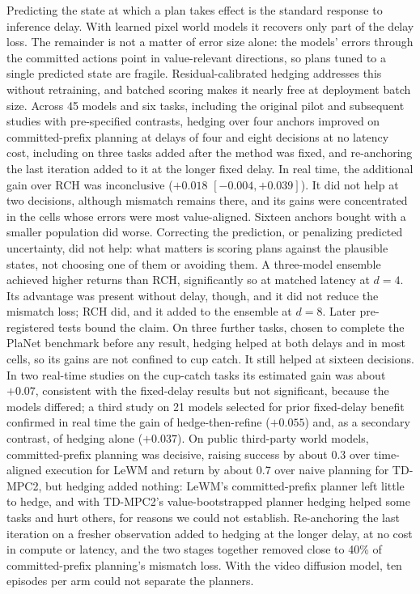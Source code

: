 \documentclass[aps,physrev,\manuscriptlayout,superscriptaddress,
  longbibliography,amsmath,amssymb]{revtex4-2}
\begin{document}
Predicting the state at which a plan takes effect is the standard response to inference delay\cite{findeisen2004computational,elasri2025rthcp,muppidi2026time}. With learned pixel world models it recovers only part of the delay loss. The remainder is not a matter of error size alone: the models' errors through the committed actions point in value-relevant directions, so plans tuned to a single predicted state are fragile. Residual-calibrated hedging addresses this without retraining, and batched scoring makes it nearly free at deployment batch size. Across 45 models and six tasks, including the original pilot and subsequent studies with pre-specified contrasts, hedging over four anchors improved on committed-prefix planning at delays of four and eight decisions at no latency cost, including on three tasks added after the method was fixed, and re-anchoring the last iteration added to it at the longer fixed delay. In real time, the additional gain over RCH was inconclusive ($+0.018$ $[-0.004, +0.039]$). It did not help at two decisions, although mismatch remains there, and its gains were concentrated in the cells whose errors were most value-aligned. Sixteen anchors bought with a smaller population did worse. Correcting the prediction, or penalizing predicted uncertainty, did not help: what matters is scoring plans against the plausible states, not choosing one of them or avoiding them. A three-model ensemble achieved higher returns than RCH, significantly so at matched latency at $d=4$. Its advantage was present without delay, though, and it did not reduce the mismatch loss; RCH did, and it added to the ensemble at $d=8$. Later pre-registered tests bound the claim. On three further tasks, chosen to complete the PlaNet benchmark before any result, hedging helped at both delays and in most cells, so its gains are not confined to cup catch. It still helped at sixteen decisions. In two real-time studies on the cup-catch tasks its estimated gain was about $+0.07$, consistent with the fixed-delay results but not significant, because the models differed; a third study on 21 models selected for prior fixed-delay benefit confirmed in real time the gain of hedge-then-refine ($+0.055$) and, as a secondary contrast, of hedging alone ($+0.037$). On public third-party world models, committed-prefix planning was decisive, raising success by about 0.3 over time-aligned execution for LeWM and return by about 0.7 over naive planning for TD-MPC2, but hedging added nothing: LeWM's committed-prefix planner left little to hedge, and with TD-MPC2's value-bootstrapped planner hedging helped some tasks and hurt others, for reasons we could not establish. Re-anchoring the last iteration on a fresher observation added to hedging at the longer delay, at no cost in compute or latency, and the two stages together removed close to 40\% of committed-prefix planning's mismatch loss. With the video diffusion model, ten episodes per arm could not separate the planners.
\end{document}
